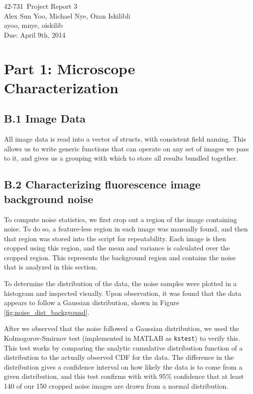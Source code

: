 \documentclass{article}
\newcommand{\hmwkTitle}{Project Report 3}
\newcommand{\hmwkDueDate}{April 9th, 2014}
\newcommand{\hmwkClass}{42-731}
\newcommand{\hmwkAuthor}{Alex Sun Yoo, Michael Nye, Ozan Iskilibli}
\newcommand{\hmwkEmail}{ayoo, mnye, oiskilib}
\newcommand{\hmwkCollaborators}{}
\begin{document}
\thispagestyle{plain}
\begin{center}
{\Large \hmwkClass\ \hmwkTitle} \\
\hmwkAuthor \\
\hmwkEmail \\
\ifthenelse{\equal{\hmwkCollaborators}{}}{}{Collaborators: \hmwkCollaborators\\}
Due: \hmwkDueDate\\
\end{center}

\section*{Part 1: Microscope Characterization}

\subsection*{B.1 Image Data}

All image data is read into a vector of structs, with consistent field naming. This allows us to write generic functions that can operate on any set of images we pass to it, and gives us a grouping with which to store all results bundled together.


\subsection*{B.2 Characterizing fluorescence image background noise}

To compute noise statistics, we first crop out a region of the image containing noise. To do so, a feature-less region in each image was manually found, and then that region was stored into the script for repeatability. Each image is then cropped using this region, and the mean and variance is calculated over the cropped region. This represents the background region and contains the noise that is analyzed in this section.

To determine the distribution of the data, the noise samples were plotted in a histogram and inspected visually. Upon observation, it was found that the data appears to follow a Gaussian distribution, shown in Figure \ref{fig:noise_dist_background}.

After we observed that the noise followed a Gaussian distribution, we used the Kolmogorov-Smirnov test (implemented in MATLAB as \verb|kstest|) to verify this. This test works by comparing the analytic cumulative distribution function of a distribution to the actually observed CDF for the data. The difference in the distribution gives a confidence interval on how likely the data is to come from a given distribution, and this test confirms with with 95\% confidence that at least 140 of our 150 cropped noise images are drawn from a normal distribution.
\end{document}
